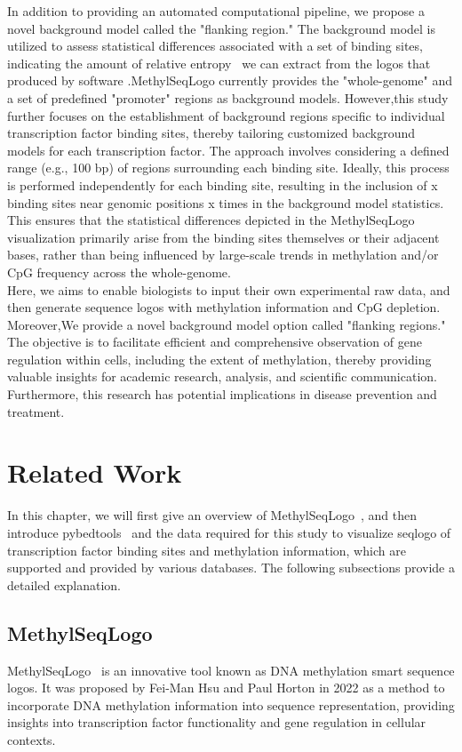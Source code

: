 \documentclass{PHlab-thesis}
\begin{document}
In addition to providing an automated computational pipeline, we propose a novel background model called the "flanking region." The background model is utilized to assess statistical differences associated with a set of binding sites, indicating the amount of relative entropy~\cite{kullback1951information} we can extract from the logos that produced by software .MethylSeqLogo currently provides the "whole-genome" and a set of predefined "promoter" regions as background models. However,this study further focuses on the establishment of background regions specific to individual transcription factor binding sites, thereby tailoring customized background models for each transcription factor. The approach involves considering a defined range (e.g., 100 bp) of regions surrounding each binding site. Ideally, this process is performed independently for each binding site, resulting in the inclusion of x binding sites near genomic positions x times in the background model statistics. This ensures that the statistical differences depicted in the MethylSeqLogo visualization primarily arise from the binding sites themselves or their adjacent bases, rather than being influenced by large-scale trends in methylation and/or CpG frequency across the whole-genome.\\
Here, we aims to enable biologists to input their own experimental raw data, and then generate sequence logos with methylation information and CpG depletion. Moreover,We provide a novel background model option called "flanking regions." The objective is to facilitate efficient and comprehensive observation of gene regulation within cells, including the extent of methylation, thereby providing valuable insights for academic research, analysis, and scientific communication. Furthermore, this research has potential implications in disease prevention and treatment.
\chapter{Related Work}
In this chapter, we will first give an overview of MethylSeqLogo~\cite{Hsu2022.11.05.515271}, and then introduce pybedtools~\cite{10.1093/bioinformatics/btr539} and the data required for this study to visualize seqlogo of transcription factor binding sites and methylation information, which are supported and provided by various databases. The following subsections provide a detailed explanation.
\section{MethylSeqLogo}
MethylSeqLogo~\cite{Hsu2022.11.05.515271} is an innovative tool known as DNA methylation smart sequence logos. It was proposed by Fei-Man Hsu and Paul Horton in 2022 as a method to incorporate DNA methylation information into sequence representation, providing insights into transcription factor functionality and gene regulation in cellular contexts.
\end{document}
